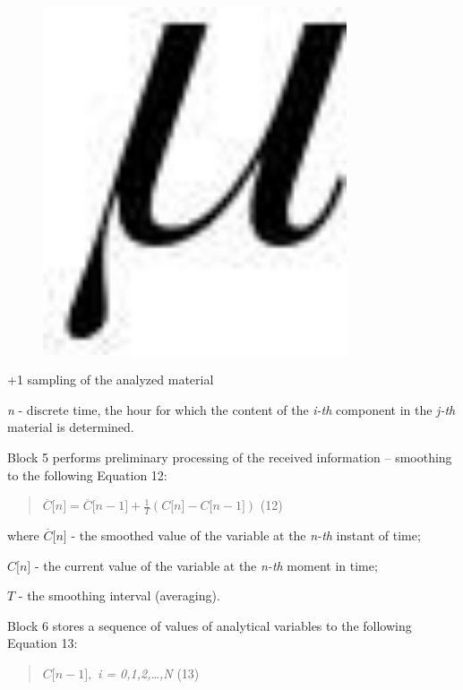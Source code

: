 \begin{figure}[H]
	\centering
	\includegraphics[width=0.8\textwidth]{assets/8}
	\caption*{}
\end{figure}+1 sampling of the analyzed material

\emph{n} - discrete time, the hour for which the content of the
\emph{i-th} component in the \emph{j-th} material is determined.

Block 5 performs preliminary processing of the received information --
smoothing to the following Equation 12:

\begin{quote}
\(\overline{C}\lbrack n\rbrack = \overline{C}\lbrack n - 1\rbrack + \frac{1}{T}\left( C\lbrack n\rbrack - C\lbrack n - 1\rbrack \right)\)
(12)
\end{quote}

where \(\overline{C}\lbrack n\rbrack\) - the smoothed value of the
variable at the \emph{n-th} instant of time;

\(C\lbrack n\rbrack\) - the current value of the variable at the
\emph{n-th} moment in time;

\(T\) - the smoothing interval (averaging).

Block 6 stores a sequence of values of analytical variables to the
following Equation 13:

\begin{quote}
\(C\lbrack n - 1\rbrack,\) \emph{i = 0,1,2,\ldots,N} (13)
\end{quote}

